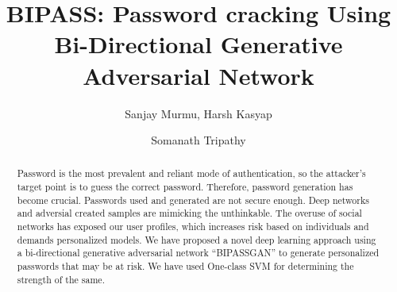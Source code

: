 \documentclass[runningheads]{llncs}
\newcommand{\quotes}[1]{``#1''}
\begin{document}
%
\title{BIPASS: Password cracking  Using Bi-Directional Generative Adversarial Network} %
%
%
\author{Sanjay Murmu, Harsh Kasyap \and Somanath Tripathy}
%
%
%
\maketitle              %
%
\begin{abstract}
Password is the most prevalent and reliant mode of authentication, so the attacker's target point is to guess the correct password.  Therefore, password generation has become crucial. %
Passwords used and generated are not secure enough. Deep networks and adversial created samples are mimicking the unthinkable. The overuse of social networks has exposed our user profiles, which increases risk based on individuals and demands personalized models. We have proposed a novel deep learning approach using a bi-directional generative adversarial network  \quotes{BIPASSGAN} to generate personalized passwords that may be at risk. We have used One-class SVM for determining the strength of the same.

\end{abstract}
%
%
%
\end{document}
